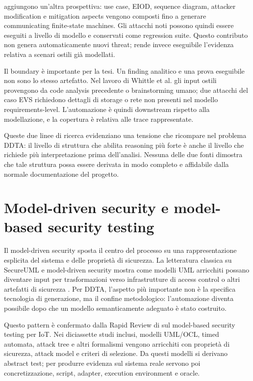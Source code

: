 \documentclass[12pt,a4paper,oneside]{report}
\begin{document}
\citet{whittle2008executable} aggiungono un'altra prospettiva: use case, EIOD, sequence diagram, attacker modification e mitigation aspects vengono composti fino a generare communicating finite-state machines. Gli attacchi noti possono quindi essere eseguiti a livello di modello e conservati come regression suite. Questo contributo non genera automaticamente nuovi threat; rende invece eseguibile l'evidenza relativa a scenari ostili già modellati.

Il boundary è importante per la tesi. Un finding analitico e una prova eseguibile non sono lo stesso artefatto. Nel lavoro di Whittle et al. gli input ostili provengono da code analysis precedente o brainstorming umano; due attacchi del caso EVS richiedono dettagli di storage o rete non presenti nel modello requirements-level. L'automazione è quindi downstream rispetto alla modellazione, e la copertura è relativa alle trace rappresentate.

Queste due linee di ricerca evidenziano una tensione che ricompare nel problema DDTA: il livello di struttura che abilita reasoning più forte è anche il livello che richiede più interpretazione prima dell'analisi. Nessuna delle due fonti dimostra che tale struttura possa essere derivata in modo completo e affidabile dalla normale documentazione del progetto.

\section{Model-driven security e model-based security testing}

Il model-driven security sposta il centro del processo su una rappresentazione esplicita del sistema e delle proprietà di sicurezza. La letteratura classica su SecureUML e model-driven security mostra come modelli UML arricchiti possano diventare input per trasformazioni verso infrastrutture di access control o altri artefatti di sicurezza \citep{lodderstedt2002secureuml,basin2006model}. Per DDTA, l'aspetto più importante non è la specifica tecnologia di generazione, ma il confine metodologico: l'automazione diventa possibile dopo che un modello semanticamente adeguato è stato costruito.

Questo pattern è confermato dalla Rapid Review di \citet{lonetti2023mbstiot} sul model-based security testing per IoT. Nei diciassette studi inclusi, modelli UML/OCL, timed automata, attack tree e altri formalismi vengono arricchiti con proprietà di sicurezza, attack model e criteri di selezione. Da questi modelli si derivano abstract test; per produrre evidenza sul sistema reale servono poi concretizzazione, script, adapter, execution environment e oracle.
\end{document}
